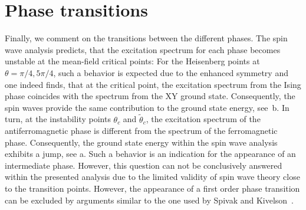 \section{Phase transitions}
Finally, we comment on the transitions between the different phases. The spin wave analysis predicts,
that the excitation spectrum for each phase becomes unstable at the mean-field critical points: For the Heisenberg
points at $\theta = \pi/4, 5\pi/4$, such a behavior is expected due to the enhanced symmetry and one indeed finds,
that at the critical point, the excitation spectrum from the Ising phase coincides with the spectrum from the XY ground state.
Consequently, the spin waves provide the same contribution to the ground state energy, see~b. In turn, at the instability points
$\theta_{c}$ and $\tilde{\theta}_{c}$, the excitation spectrum of the antiferromagnetic phase is different from the spectrum of the ferromagnetic phase.
Consequently, the ground state energy within the spin wave analysis exhibits a jump, see a. Such a behavior is an indication
for the appearance of an intermediate phase. However, this question can not be conclusively answered within the presented analysis due to the limited validity of spin wave theory close to the transition points. However, the appearance of a first order phase transition can be excluded by arguments similar to the one used by Spivak and Kivelson~\cite{Spivak2004}.
